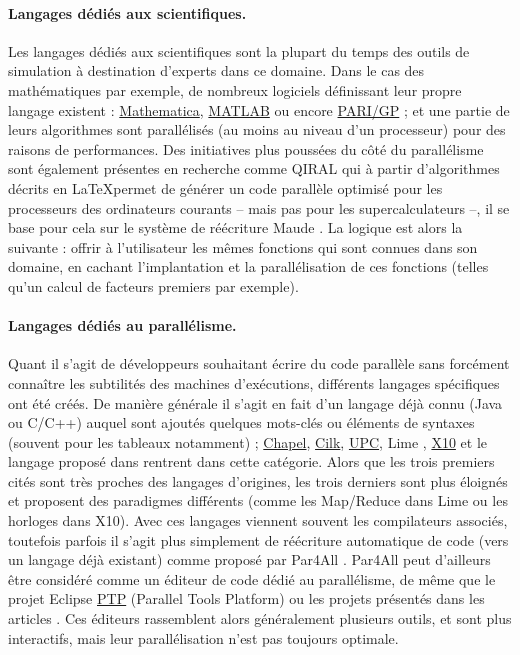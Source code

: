 \paragraph{Langages dédiés aux scientifiques.}
Les langages dédiés aux scientifiques sont la plupart du temps des outils de simulation à destination d'experts dans ce domaine. Dans le cas des mathématiques par exemple, de nombreux logiciels définissant leur propre langage existent : \textsf{\href{http://www.wolfram.com/mathematica/}{Mathematica}}, \textsf{\href{http://fr.mathworks.com/}{MATLAB}} ou encore \textsf{\href{http://pari.math.u-bordeaux.fr/}{PARI/GP}} ; et une partie de leurs algorithmes sont parallélisés (au moins au niveau d'un processeur) pour des raisons de performances. Des initiatives plus poussées du côté du parallélisme sont également présentes en recherche comme \textsf{QIRAL} \cite{Art13,Art14} qui à partir d'algorithmes décrits en \LaTeX permet de générer un code parallèle optimisé pour les processeurs des ordinateurs courants -- mais pas pour les supercalculateurs --, il se base pour cela sur le système de réécriture \textsf{Maude} \cite{Art12}. La logique est alors la suivante : offrir à l'utilisateur les mêmes fonctions qui sont connues dans son domaine, en cachant l'implantation et la parallélisation de ces fonctions (telles qu'un calcul de facteurs premiers par exemple).

\paragraph{Langages dédiés au parallélisme.}
Quant il s'agit de développeurs souhaitant écrire du code parallèle sans forcément connaître les subtilités des machines d'exécutions, différents langages spécifiques ont été créés. De manière générale il s'agit en fait d'un langage déjà connu (\textsf{Java} ou \textsf{C/C++}) auquel sont ajoutés quelques mots-clés ou éléments de syntaxes (souvent pour les tableaux notamment) ; \textsf{\href{http://chapel.cray.com/}{Chapel}}, \textsf{\href{https://www.cilkplus.org/}{Cilk}}, \textsf{\href{http://upc.lbl.gov/}{UPC}}, \textsf{Lime} \cite{Art8}, \textsf{\href{http://x10-lang.org/}{X10}} et le langage proposé dans\cite{Art10} rentrent dans cette catégorie. Alors que les trois premiers cités sont très proches des langages d'origines, les trois derniers sont plus éloignés et proposent des paradigmes différents (comme les Map/Reduce dans \textsf{Lime} ou les horloges dans \textsf{X10}). Avec ces langages viennent souvent les compilateurs associés, toutefois parfois il s'agit plus simplement de réécriture automatique de code (vers un langage déjà existant) comme proposé par \textsf{Par4All} \cite{Ths2}. \textsf{Par4All} peut d'ailleurs être considéré comme un éditeur de code dédié au parallélisme, de même que le projet \textsf{Eclipse \href{http://www.eclipse.org/ptp/}{PTP}} (Parallel Tools Platform) ou les projets présentés dans les articles \cite{Art23,Art25}. Ces éditeurs rassemblent alors généralement plusieurs outils, et sont plus interactifs, mais leur parallélisation n'est pas toujours optimale.

